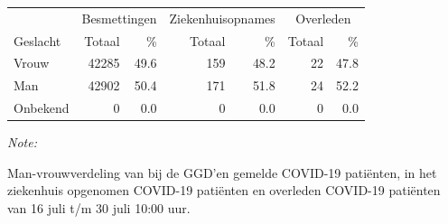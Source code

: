 \documentclass[
  english,
  man,floatsintext]{apa6}
\begin{document}
\begin{table}
\centering\begingroup\fontsize{11}{13}\selectfont

\begin{threeparttable}
\begin{tabular}{lrrrrrr}
\toprule
\multicolumn{1}{c}{ } & \multicolumn{2}{c}{Besmettingen} & \multicolumn{2}{c}{Ziekenhuisopnames} & \multicolumn{2}{c}{Overleden} \\
\cmidrule(l{3pt}r{3pt}){2-3} \cmidrule(l{3pt}r{3pt}){4-5} \cmidrule(l{3pt}r{3pt}){6-7}
Geslacht & Totaal & \% & Totaal & \% & Totaal & \%\\
\midrule
Vrouw & 42285 & 49.6 & 159 & 48.2 & 22 & 47.8\\
Man & 42902 & 50.4 & 171 & 51.8 & 24 & 52.2\\
Onbekend & 0 & 0.0 & 0 & 0.0 & 0 & 0.0\\
\bottomrule
\end{tabular}
\begin{tablenotes}
\item \textit{Note: } 
\item Man-vrouwverdeling van bij de GGD’en gemelde COVID-19 patiënten, in het ziekenhuis opgenomen COVID-19 patiënten en overleden COVID-19 patiënten van 16 juli t/m 30 juli 10:00 uur.
\end{tablenotes}
\end{threeparttable}
\endgroup{}
\end{table}
\newpage
\end{document}
